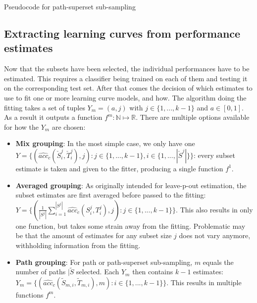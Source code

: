 \begin{algorithm}[h]
	\begin{algorithmic}[1]
		\State {}
		\State {}
		\EndFor
		\State {}
		\EndFor
	\end{algorithmic}
	\caption{Pseudocode for path-superset sub-sampling}
	\label{alg:resPathSubSampling}
\end{algorithm}

\subsection{Extracting learning curves from performance estimates}
Now that the subsets have been selected, the individual performances have to be estimated. This requires a classifier being trained on each of them and testing it on the corresponding test set. After that comes the decision of which estimates to use to fit one or more learning curve models, and how. The algorithm doing the fitting takes a set of tuples $Y_m = {(a,j)}$ with $j \in \{1,...,k-1\}$ and $a \in [0,1]$. As a result it outputs a function $f^m: \mathbb{N} \mapsto \mathbb{R}$. There are multiple options available for how the $Y_m$ are chosen:
\begin{itemize}
	\item \textbf{Mix grouping}: In the most simple case, we only have one $Y = \{(\widehat{acc}_c(\check{S}^j_i, \check{T}^j_i), j): j\in\{1,...,k-1\}, i\in\{1,...,|\check{S}^j|\}\}$: every subset estimate is taken and given to the fitter, producing a single function $f^1$.
	\item \textbf{Averaged grouping}: As originally intended for leave-p-out estimation, the subset estimates are first averaged before passed to the fitting:\\$Y = \{(\frac{1}{|S^j|} \sum_{i=1}^{|S^j|} \widehat{acc}_c(S^j_i, T^j_i), j): j \in \{1,...,k-1\}\}$. This also results in only one function, but takes some strain away from the fitting. Problematic may be that the amount of estimates for any subset size $j$ does not vary anymore, withholding information from the fitting.
	\item \textbf{Path grouping}: For path or path-superset sub-sampling, $m$ equals the number of paths $|\tilde{S}$ selected. Each $Y_m$ then contains $k-1$ estimates: $Y_m = \{(\widehat{acc}_c(\tilde{S}_{m,i}, \tilde{T}_{m,i}), m): i \in \{1,...,k-1\}\}$. This results in multiple functions $f^m$.
\end{itemize}

